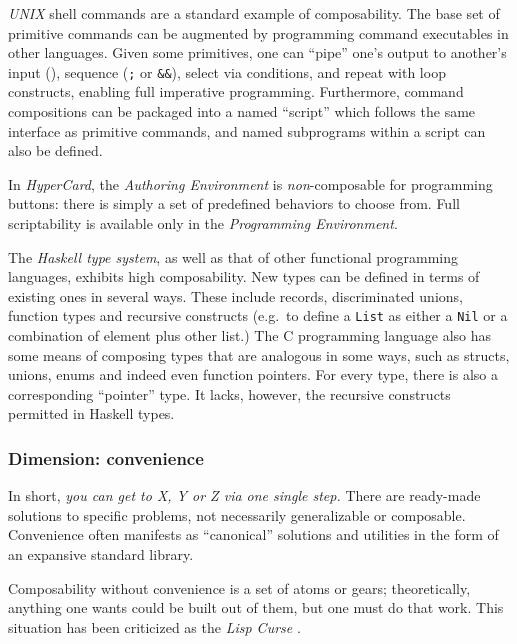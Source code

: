 \documentclass[english,submission]{programming}
\begin{document}
\emph{UNIX} shell commands are a standard example of composability. The
base set of primitive commands can be augmented by programming command
executables in other languages. Given some primitives, one can ``pipe''
one's output to another's input (\texttt{\textbar{}}), sequence
(\texttt{;} or \texttt{\&\&}), select via conditions, and repeat with
loop constructs, enabling full imperative programming. Furthermore,
command compositions can be packaged into a named ``script'' which
follows the same interface as primitive commands, and named subprograms
within a script can also be defined.

In \emph{HyperCard}, the \emph{Authoring Environment} is
\emph{non}-composable for programming buttons: there is simply a set of
predefined behaviors to choose from. Full scriptability is available
only in the \emph{Programming Environment}.

The \emph{Haskell type system}, as well as that of other functional
programming languages, exhibits high composability. New types can be
defined in terms of existing ones in several ways. These include
records, discriminated unions, function types and recursive constructs
(e.g.~to define a \texttt{List} as either a \texttt{Nil} or a
combination of element plus other list.) The C programming language also
has some means of composing types that are analogous in some ways, such
as structs, unions, enums and indeed even function pointers. For every
type, there is also a corresponding ``pointer'' type. It lacks, however,
the recursive constructs permitted in Haskell types.


\hypertarget{dimension-convenience}{%
\subsubsection{Dimension: convenience}\label{dimension-convenience}}

In short, \emph{you can get to X, Y or Z via one single step.} There are
ready-made solutions to specific problems, not necessarily generalizable
or composable. Convenience often manifests as ``canonical'' solutions
and utilities in the form of an expansive standard library.

Composability without convenience is a set of atoms or gears;
theoretically, anything one wants could be built out of them, but one
must do that work. This situation has been criticized as the \emph{Lisp
Curse} \cite{LispCurse}.
\end{document}
